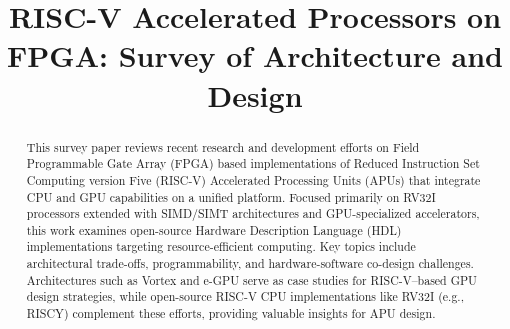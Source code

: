\documentclass[conference]{IEEEtran}
\begin{document}
\title{RISC-V Accelerated Processors on FPGA: Survey of Architecture and Design}

\author{
\and
{}
\and
{}
\and
{}
\and
{}
}

\maketitle

\begin{abstract}
This survey paper reviews recent research and development efforts on Field Programmable Gate Array (FPGA) based implementations of Reduced Instruction Set Computing version Five (RISC-V) Accelerated Processing Units (APUs) that integrate CPU and GPU capabilities on a unified platform. Focused primarily on RV32I processors extended with SIMD/SIMT architectures and GPU-specialized accelerators, this work examines open-source Hardware Description Language (HDL) implementations targeting resource-efficient computing. Key topics include architectural trade-offs, programmability, and hardware-software co-design challenges. Architectures such as Vortex and e-GPU serve as case studies for RISC-V–based GPU design strategies, while open-source RISC-V CPU implementations like RV32I (e.g., RISCY) complement these efforts, providing valuable insights for APU design.
\end{abstract}
\end{document}
